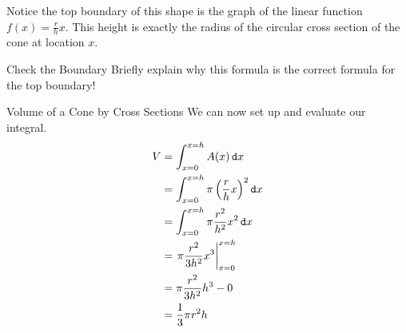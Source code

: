 Notice the top boundary of this shape is the graph of the linear function $f(x)=\frac{r}{h}x$.  This height is exactly the radius of the circular cross section of the cone at location $x$. 
\begin{exercise}{Check the Boundary \Coffeecup}
  Briefly explain why this formula is the correct formula for the top boundary!
\end{exercise}
\begin{example}{Volume of a Cone by Cross Sections}
We can now set up and evaluate our  integral. \begin{align*}
V&=\int_{x=0}^{x=h}A(x) \mathop{}\!\mathtt{d} x \\
&= \int_{x=0}^{x=h}\pi \left(\frac{r}{h}x\right)^2 \mathop{}\!\mathtt{d} x \\
&= \int_{x=0}^{x=h}\pi \frac{r^2}{h^2}x^2 \mathop{}\!\mathtt{d} x \\
&= \left.\pi \frac{r^2}{3h^2}x^3 \right|_{x=0}^{x=h} \\
&= \pi \frac{r^2}{3h^2}h^3 -0 \\
&= \frac{1}{3}\pi r^2 h
\end{align*}

\end{example}


